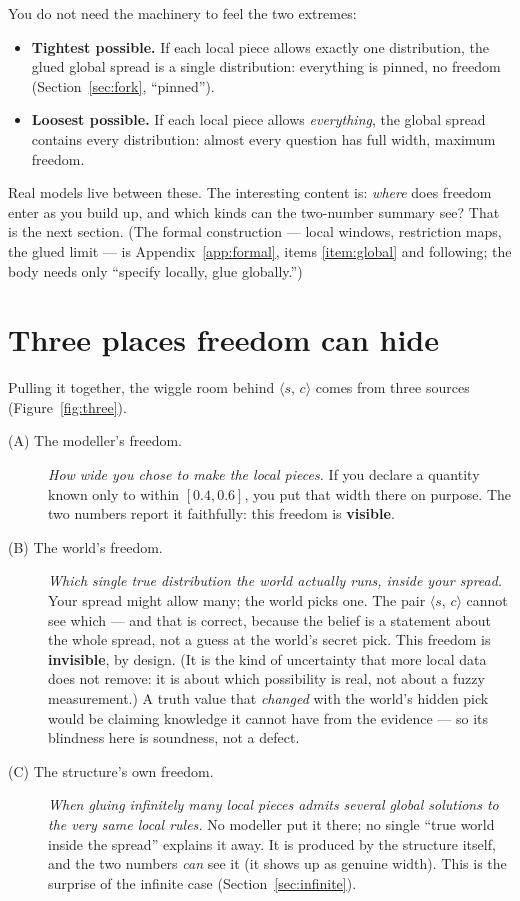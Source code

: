 \documentclass[]{article}
\newcommand{\STV}[2]{\langle #1,\, #2 \rangle}
\begin{document}
You do not need the machinery to feel the two extremes:

\begin{itemize}
\item \textbf{Tightest possible.} If each local piece allows exactly one
distribution, the glued global spread is a single distribution: everything is
pinned, no freedom (Section~\ref{sec:fork}, ``pinned'').
\item \textbf{Loosest possible.} If each local piece allows \emph{everything},
the global spread contains every distribution: almost every question has full
width, maximum freedom.
\end{itemize}

Real models live between these. The interesting content is: \emph{where} does
freedom enter as you build up, and which kinds can the two-number summary see?
That is the next section. (The formal construction --- local windows, restriction
maps, the glued limit --- is Appendix~\ref{app:formal}, items \ref{item:global}
and following; the body needs only ``specify locally, glue globally.'')

\section{Three places freedom can hide}\label{sec:three}

Pulling it together, the wiggle room behind $\STV{s}{c}$ comes from three
sources (Figure~\ref{fig:three}).

\begin{description}
\item[(A) The modeller's freedom.] \emph{How wide you chose to make the local
pieces.} If you declare a quantity known only to within $[0.4,0.6]$, you put
that width there on purpose. The two numbers report it faithfully: this freedom
is \textbf{visible}.
\item[(B) The world's freedom.] \emph{Which single true distribution the world
actually runs, inside your spread.} Your spread might allow many; the world picks
one. The pair $\STV{s}{c}$ cannot see which --- and that is correct, because the
belief is a statement about the whole spread, not a guess at the world's secret
pick. This freedom is \textbf{invisible}, by design. (It is the kind of
uncertainty that more local data does not remove: it is about which possibility
is real, not about a fuzzy measurement.) A truth value that \emph{changed} with
the world's hidden pick would be claiming knowledge it cannot have from the
evidence --- so its blindness here is soundness, not a defect.
\item[(C) The structure's own freedom.] \emph{When gluing infinitely many local
pieces admits several global solutions to the very same local rules.} No
modeller put it there; no single ``true world inside the spread'' explains it
away. It is produced by the structure itself, and the two numbers \emph{can} see
it (it shows up as genuine width). This is the surprise of the infinite case
(Section~\ref{sec:infinite}).
\end{description}
\end{document}
